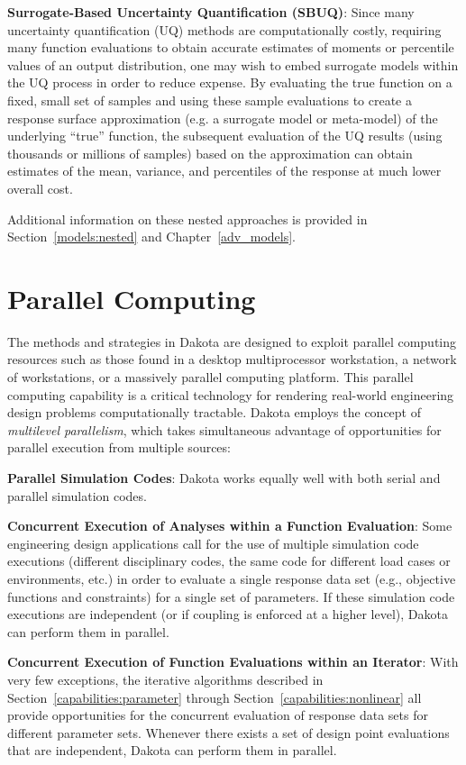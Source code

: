 \textbf{Surrogate-Based Uncertainty Quantification (SBUQ)}: 
Since many uncertainty quantification (UQ) methods are computationally
costly, requiring many function evaluations to obtain accurate
estimates of moments or percentile values of an output distribution,
one may wish to embed surrogate models within the UQ process in order
to reduce expense.  By evaluating the true function on a fixed, small
set of samples and using these sample evaluations to create a response
surface approximation (e.g. a surrogate model or meta-model) of the
underlying ``true'' function, the subsequent evaluation of the UQ
results (using thousands or millions of samples) based on the
approximation can obtain estimates of the mean, variance, and
percentiles of the response at much lower overall cost.

Additional information on these nested approaches is provided in
Section~\ref{models:nested} and Chapter~\ref{adv_models}.

\section{Parallel Computing}\label{capabilities:parallel}

The methods and strategies in Dakota are designed to exploit parallel
computing resources such as those found in a desktop multiprocessor
workstation, a network of workstations, or a massively parallel
computing platform. This parallel computing capability is a critical
technology for rendering real-world engineering design problems
computationally tractable. Dakota employs the concept of
\emph{multilevel parallelism}, which takes simultaneous advantage of
opportunities for parallel execution from multiple sources:

\textbf{Parallel Simulation Codes}: Dakota works equally well with both
serial and parallel simulation codes.

\textbf{Concurrent Execution of Analyses within a Function Evaluation}:
Some engineering design applications call for the use of multiple
simulation code executions (different disciplinary codes, the same
code for different load cases or environments, etc.) in order to
evaluate a single response data set (e.g., objective functions and
constraints) for a single set of parameters. If these simulation code
executions are independent (or if coupling is enforced at a higher
level), Dakota can perform them in parallel.

\textbf{Concurrent Execution of Function Evaluations within an Iterator}:
With very few exceptions, the iterative algorithms described in
Section~\ref{capabilities:parameter} through
Section~\ref{capabilities:nonlinear} all provide opportunities for the
concurrent evaluation of response data sets for different parameter
sets. Whenever there exists a set of design point evaluations that are
independent, Dakota can perform them in parallel.

